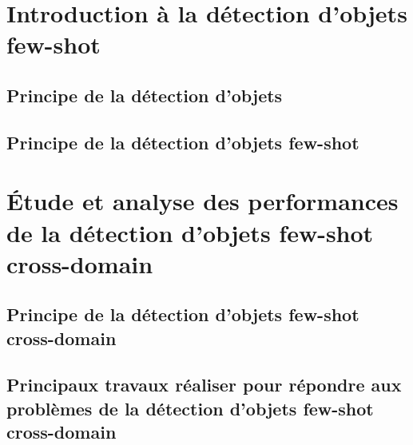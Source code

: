 \documentclass[xcolor=table, 8pt]{beamer}
\begin{document}
    \maketitle
    


    \section{Introduction à la détection d'objets few-shot}\label{sec:od-fsod}

    \subsection{Principe de la détection d'objets}\label{subsec:object-detection}
    

    \subsection{Principe de la détection d'objets few-shot}\label{subsec:fs-od-definition}
    

%    
%    

    \section{Étude et analyse des performances de la détection d'objets few-shot cross-domain}\label{subsec:fs-od-cd}
    \subsection{Principe de la détection d'objets few-shot cross-domain}\label{subsec:fs-od-cd-principle}
    
    \subsection{Principaux travaux réaliser pour répondre aux problèmes de la détection d'objets few-shot cross-domain}\label{subsec:fs-od-cd-research}
    
\end{document}
